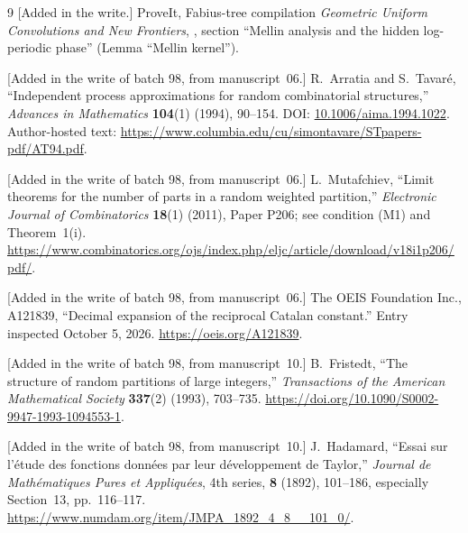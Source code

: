 \documentclass[11pt,a4paper]{article}
\numberwithin{equation}{section}
\theoremstyle{definition}
\theoremstyle{remark}
\begin{document}
\begin{thebibliography}{9}
[Added in the write.] ProveIt, Fabius-tree compilation
\emph{Geometric Uniform Convolutions and New Frontiers},
,
section ``Mellin analysis and the hidden log-periodic phase'' (Lemma
``Mellin kernel'').

[Added in the write of batch 98, from manuscript~06.] R.~Arratia and
S.~Tavar\'e, ``Independent process approximations for random combinatorial
structures,'' \emph{Advances in Mathematics} \textbf{104}(1) (1994),
90--154. DOI:
\href{https://doi.org/10.1006/aima.1994.1022}{10.1006/aima.1994.1022}.
Author-hosted text:
\url{https://www.columbia.edu/cu/simontavare/STpapers-pdf/AT94.pdf}.

[Added in the write of batch 98, from manuscript~06.] L.~Mutafchiev,
``Limit theorems for the number of parts in a random weighted partition,''
\emph{Electronic Journal of Combinatorics} \textbf{18}(1) (2011), Paper
P206; see condition (M1) and Theorem~1(i).
\url{https://www.combinatorics.org/ojs/index.php/eljc/article/download/v18i1p206/pdf/}.

[Added in the write of batch 98, from manuscript~06.] The OEIS Foundation
Inc., A121839, ``Decimal expansion of the reciprocal Catalan constant.''
Entry inspected October 5, 2026. \url{https://oeis.org/A121839}.

[Added in the write of batch 98, from manuscript~10.] B.~Fristedt, ``The
structure of random partitions of large integers,'' \emph{Transactions of
the American Mathematical Society} \textbf{337}(2) (1993), 703--735.
\url{https://doi.org/10.1090/S0002-9947-1993-1094553-1}.

[Added in the write of batch 98, from manuscript~10.] J.~Hadamard, ``Essai
sur l'\'etude des fonctions donn\'ees par leur d\'eveloppement de Taylor,''
\emph{Journal de Math\'ematiques Pures et Appliqu\'ees}, 4th series,
\textbf{8} (1892), 101--186, especially Section~13, pp.~116--117.
\url{https://www.numdam.org/item/JMPA_1892_4_8__101_0/}.
\end{thebibliography}
\end{document}
